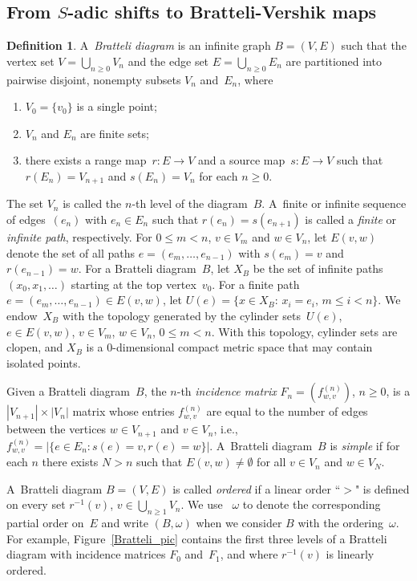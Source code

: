 \documentclass{amsart}
\theoremstyle{definition}
\newtheorem{definition}[lemma]{Definition}
\theoremstyle{remark}
\numberwithin{equation}{section}
\begin{document}
\subsection{From $S$-adic shifts to Bratteli-Vershik maps }
\begin{definition}\label{Definition_Bratteli_Diagram}
A~\emph{Bratteli diagram} is an infinite graph $B=(V,E)$ such that the vertex set $V=\bigcup_{n\geq 0}V_n$ and the edge set $E = \bigcup_{n\geq 0} E_n$ are partitioned into pairwise disjoint, nonempty subsets $V_n$ and~$E_n$, where
\renewcommand{\theenumi}{\roman{enumi}}
\begin{enumerate}
\item
$V_0=\{v_0\}$ is a single point;
\item
$V_n$ and $E_n$ are finite sets;
\item
there exists a range map~$r:E\rightarrow V$ and a source map~$s:E\rightarrow V$ such that $r(E_n)= V_{n+1}$ and  $s(E_n)= V_n$ for each $n\geq 0$.
\end{enumerate}
\end{definition}

The set $V_n$ is called the $n$-th level of the diagram~$B$. 
A~finite or infinite sequence of edges~$(e_n)$ with $e_n\in E_n$ such that $r(e_n)=s(e_{n+1})$ is called a \emph{finite} or \emph{infinite path}, respectively. 
For $0 \le m<n$, $v \in V_{m}$ and $w \in V_{n}$, let $E(v,w)$ denote the set of all paths $e = (e_m,\ldots, e_{n-1})$ with $s(e_m)=v$ and $r(e_{n-1})=w$. 
For a Bratteli diagram~$B$, let $X_B$ be the set of infinite paths $(x_0,x_1,\dots)$ starting at the top vertex~$v_0$.
For a finite path $e =  (e_m,\ldots, e_{n-1})  \in E(v,w)$, let  $U(e) = \{x\in X_B:\, x_i=e_i,\, m\le i < n\}$.
We endow~$X_B$ with the topology generated by the cylinder sets~$U(e)$, $e\in E(v,w)$, $v\in V_m$, $w\in V_n$, $0\leq m<n$.  
With this topology, cylinder sets are clopen, and $X_B$ is a $0$-dimensional compact metric space that may contain isolated points.  

Given a Bratteli diagram~$B$, the $n$-th \emph{incidence matrix} $F_{n} = (f^{(n)}_{w,v})$, $n \ge 0$, is a $|V_{n+1}|\times |V_n|$ matrix whose entries $f^{(n)}_{w,v}$ are equal to the number of edges between the vertices $w\in V_{n+1}$ and $v\in V_{n}$, i.e., $f^{(n)}_{w,v} = |\{e\in E_n : s(e) = v, r(e) = w\}|$.
A~Bratteli diagram~$B$ is \emph{simple} if for each $n$ there exists $N>n$ such that $E(v,w) \ne \emptyset$ for all $v \in V_n$ and $w \in V_N$.
 
A~Bratteli diagram $B=(V,E) $ is called \emph{ordered} if a linear order ``$>$" is defined on every set $r^{-1}(v)$, $v\in \bigcup_{n\ge 1} V_n$. 
We use ~$\omega$ to denote the corresponding partial order on~$E$ and write $(B,\omega)$ when we consider $B$ with the ordering~$\omega$.
For example, Figure~\ref{Bratteli_pic} contains the first three levels of a Bratteli diagram with incidence matrices $F_0$ and~$F_1$, and where $r^{-1}(v)$ is linearly ordered.
\end{document}
